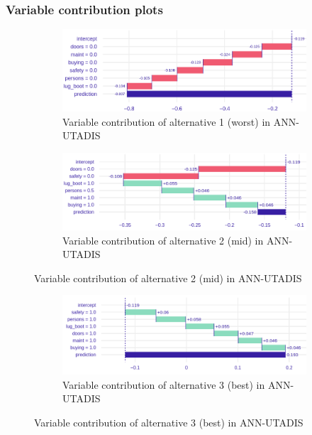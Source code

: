 \documentclass[../main.tex]{subfiles}
\begin{document}
\subsubsection{Variable contribution plots}
\begin{figure}[H]
    \centering
    \begin{subfigure}{0.78\linewidth}
        \includegraphics[width=\linewidth]{../img/UTA-breakdown-worst.png}
        \caption{Variable contribution of alternative 1 (worst) in ANN-UTADIS}
        \label{fig:UTA-3alt1-contrib}
    \end{subfigure}
    \begin{subfigure}{0.78\linewidth}
        \includegraphics[width=\linewidth]{../img/UTA-breakdown-mid.png}
        \caption{Variable contribution of alternative 2 (mid) in ANN-UTADIS}
        \label{fig:UTA-3alt2-contrib}
    \end{subfigure}\end{figure}
    \begin{figure}[H]\ContinuedFloat
    \centering
    \begin{subfigure}{0.78\linewidth}
        \includegraphics[width=\linewidth]{../img/UTA-breakdown-best.png}
        \caption{Variable contribution of alternative 3 (best) in ANN-UTADIS}
        \label{fig:UTA-3alt3-contrib}
    \end{subfigure}
\end{figure}
\end{document}
